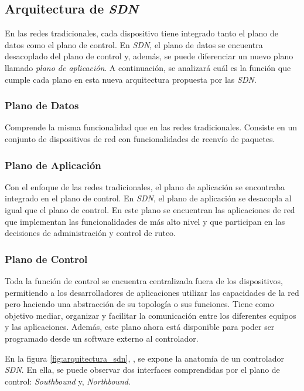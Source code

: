 \subsection{Arquitectura de \textit{SDN}}
En las redes tradicionales, cada dispositivo tiene integrado tanto el plano de datos como el plano de control. En \textit{SDN}, el plano de datos se encuentra desacoplado del plano de control y, además, se puede diferenciar un nuevo plano llamado \textit{plano de aplicación}. A continuación, se analizará cuál es la función que cumple cada plano en esta nueva arquitectura propuesta por las \textit{SDN}.

\subsubsection{Plano de Datos}
Comprende la misma funcionalidad que en las redes tradicionales. Consiste en un conjunto de dispositivos de red con funcionalidades de reenvío de paquetes.

\subsubsection{Plano de Aplicación}
Con el enfoque de las redes tradicionales, el plano de aplicación se encontraba integrado en el plano de control. En \textit{SDN}, el plano de aplicación se desacopla al igual que el plano de control. En este plano se encuentran las aplicaciones de red que implementan las funcionalidades de más alto nivel y que participan en las decisiones de administración y control de ruteo.

\subsubsection{Plano de Control}
Toda la función de control se encuentra centralizada fuera de los dispositivos, permitiendo a los desarrolladores de aplicaciones utilizar las capacidades de la red pero haciendo una abstracción de su topología o sus funciones. Tiene como objetivo mediar, organizar y facilitar la comunicación entre los diferentes equipos y las aplicaciones. Además, este plano ahora está disponible para poder ser programado desde un software externo al controlador.

En la figura \ref{fig:arquitectura_sdn}, , se expone la anatomía de un controlador \textit{SDN}. En ella, se puede observar dos interfaces comprendidas por el plano de control: \textit{Southbound} y, \textit{Northbound}.

